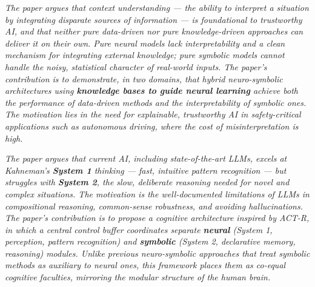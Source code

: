 \documentclass[11pt, a4paper]{article}
\begin{document}
\begin{exambox}
\textit{The paper argues that context understanding — the ability to interpret a situation by integrating disparate sources of information — is foundational to trustworthy AI, and that neither pure data-driven nor pure knowledge-driven approaches can deliver it on their own. Pure neural models lack interpretability and a clean mechanism for integrating external knowledge; pure symbolic models cannot handle the noisy, statistical character of real-world inputs. The paper's contribution is to demonstrate, in two domains, that hybrid neuro-symbolic architectures using \textbf{knowledge bases to guide neural learning} achieve both the performance of data-driven methods and the interpretability of symbolic ones. The motivation lies in the need for explainable, trustworthy AI in safety-critical applications such as autonomous driving, where the cost of misinterpretation is high.}
\end{exambox}

\begin{exambox}
\textit{The paper argues that current AI, including state-of-the-art LLMs, excels at Kahneman's \textbf{System 1} thinking — fast, intuitive pattern recognition — but struggles with \textbf{System 2}, the slow, deliberate reasoning needed for novel and complex situations. The motivation is the well-documented limitations of LLMs in compositional reasoning, common-sense robustness, and avoiding hallucinations. The paper's contribution is to propose a cognitive architecture inspired by ACT-R, in which a central control buffer coordinates separate \textbf{neural} (System 1, perception, pattern recognition) and \textbf{symbolic} (System 2, declarative memory, reasoning) modules. Unlike previous neuro-symbolic approaches that treat symbolic methods as auxiliary to neural ones, this framework places them as co-equal cognitive faculties, mirroring the modular structure of the human brain.}
\end{exambox}
\end{document}
